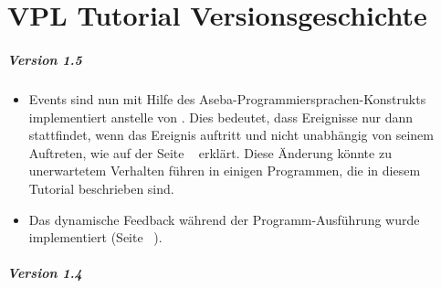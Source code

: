 
\chapter*{VPL Tutorial Versionsgeschichte}

\paragraph{Version 1.5}

\begin{itemize}

\item Events sind nun mit Hilfe des Aseba-Programmiersprachen-Konstrukts  implementiert anstelle von . Dies bedeutet, dass Ereignisse nur dann stattfindet, wenn das Ereignis auftritt und nicht unabhängig von seinem Auftreten, wie auf der Seite ~\pageref{p.if-when} erklärt. Diese Änderung könnte zu unerwartetem Verhalten führen in einigen Programmen, die in diesem Tutorial beschrieben sind.

\item Das dynamische Feedback während der Programm-Ausführung wurde implementiert (Seite ~\pageref{p.feedback}).

\end{itemize}

\paragraph{Version 1.4}

